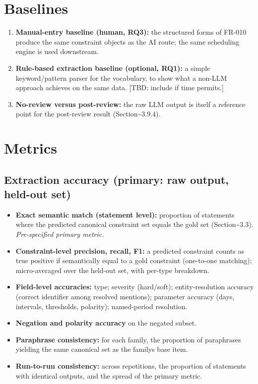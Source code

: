 \documentclass[
  11pt,a4paper,oneside]{report}
\providecommand{\tightlist}{%
  \setlength{\itemsep}{0pt}\setlength{\parskip}{0pt}}
\begin{document}
\hypertarget{baselines}{%
\section{Baselines}\label{baselines}}

\begin{enumerate}
\def\labelenumi{\arabic{enumi}.}
\tightlist
\item
  \textbf{Manual-entry baseline (human, RQ3):} the structured forms of
  FR-010 produce the same constraint objects as the AI route; the same
  scheduling engine is used downstream.
\item
  \textbf{Rule-based extraction baseline (optional, RQ1):} a simple
  keyword/pattern parser for the vocabulary, to show what a non-LLM
  approach achieves on the same data. {[}TBD: include if time
  permits.{]}
\item
  \textbf{No-review versus post-review:} the raw LLM output is itself a
  reference point for the post-review result
  (Section\textasciitilde3.9.4).
\end{enumerate}

\hypertarget{metrics}{%
\section{Metrics}\label{metrics}}

\hypertarget{extraction-accuracy-primary-raw-output-held-out-set}{%
\subsection{Extraction accuracy (primary: raw output, held-out
set)}\label{extraction-accuracy-primary-raw-output-held-out-set}}

\begin{itemize}
\tightlist
\item
  \textbf{Exact semantic match (statement level):} proportion of
  statements where the predicted canonical constraint set equals the
  gold set (Section\textasciitilde3.3). \emph{Pre-specified primary
  metric.}
\item
  \textbf{Constraint-level precision, recall, F1:} a predicted
  constraint counts as true positive if semantically equal to a gold
  constraint (one-to-one matching); micro-averaged over the held-out
  set, with per-type breakdown.
\item
  \textbf{Field-level accuracies:} type; severity (hard/soft);
  entity-resolution accuracy (correct identifier among resolved
  mentions); parameter accuracy (days, intervals, thresholds, polarity);
  named-period resolution.
\item
  \textbf{Negation and polarity accuracy} on the negated subset.
\item
  \textbf{Paraphrase consistency:} for each family, the proportion of
  paraphrases yielding the same canonical set as the
  family\textquotesingle s base item.
\item
  \textbf{Run-to-run consistency:} across repetitions, the proportion of
  statements with identical outputs, and the spread of the primary
  metric.
\end{itemize}
\end{document}
